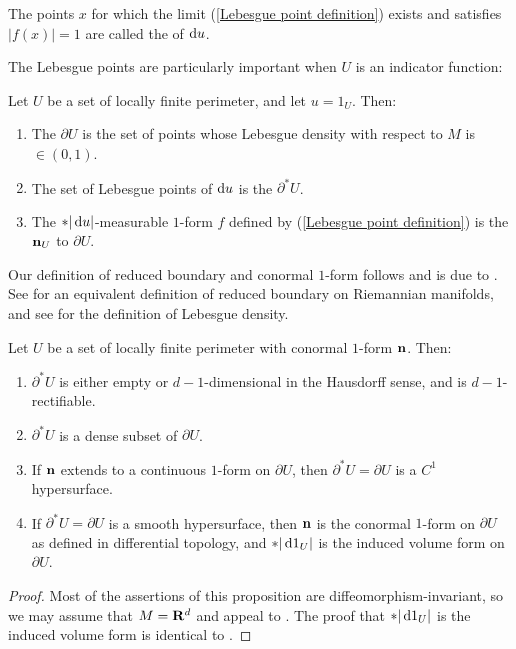 \begin{definition}
The points $x$ for which the limit (\ref{Lebesgue point definition}) exists and satisfies $|f(x)| = 1$ are called the  of $\mathop{}\!\mathrm{d} u$.
\end{definition}

The Lebesgue points are particularly important when $U$ is an indicator function:

\begin{definition}
Let $U$ be a set of locally finite perimeter, and let $u = 1_U$. Then:
\begin{enumerate}
\item The  $\partial U$ is the set of points whose Lebesgue density with respect to $M$ is $\in (0, 1)$.
\item The set of Lebesgue points of $\mathop{}\!\mathrm{d} u$ is the  $\partial^* U$.
\item The $*|\mathop{}\!\mathrm{d} u|$-measurable $1$-form $f$ defined by (\ref{Lebesgue point definition}) is the  $\mathbf n_U$ to $\partial U$.
\end{enumerate}
\end{definition}

Our definition of reduced boundary and conormal $1$-form follows \cite[Definition 3.3]{Giusti77} and is due to \cite{deGiorgi55}.
See \cite{Battista_2021} for an equivalent definition of reduced boundary on Riemannian manifolds, and see \cite[Chapter 6]{Pugh02} for the definition of Lebesgue density.

\begin{proposition}\label{locality of Caccioppoli}
    Let $U$ be a set of locally finite perimeter with conormal $1$-form $\mathbf n$.
    Then:
    \begin{enumerate}
    \item $\partial^* U$ is either empty or $d-1$-dimensional in the Hausdorff sense, and is $d-1$-rectifiable.
    \item $\partial^* U$ is a dense subset of $\partial U$.
    \item If $\mathbf n$ extends to a continuous $1$-form on $\partial U$, then $\partial^* U = \partial U$ is a $C^1$ hypersurface.
    \item If $\partial^* U = \partial U$ is a smooth hypersurface, then $\mathbf n$ is the conormal $1$-form on $\partial U$ as defined in differential topology, and $*|\mathop{}\!\mathrm{d} 1_U|$ is the induced volume form on $\partial U$.
\end{enumerate}
\end{proposition}
\begin{proof}
Most of the assertions of this proposition are diffeomorphism-invariant, so we may assume that $M = \mathbf{R}^d$ and appeal to \cite[Chapters 2-4]{Giusti77}.
The proof that $*|\mathop{}\!\mathrm{d} 1_U|$ is the induced volume form is identical to \cite[Example 1.4]{Giusti77}.
\end{proof}

